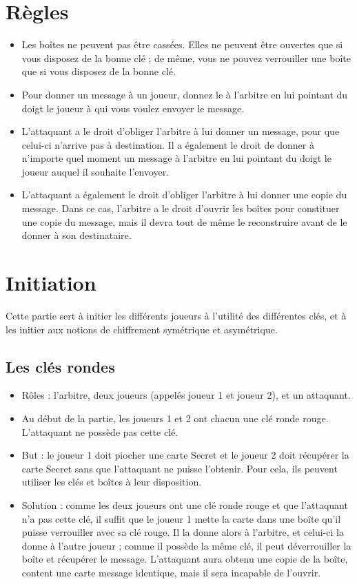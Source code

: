 \documentclass[a4paper,10pt]{article}
\begin{document}
\section{Règles}
\begin{itemize}
\item Les boîtes ne peuvent pas être cassées. Elles ne peuvent être ouvertes que si vous disposez de la bonne clé ; de même, vous ne pouvez verrouiller une boîte que si vous disposez de la bonne clé.
\item Pour donner un message à un joueur, donnez le à l'arbitre en lui pointant du doigt le joueur à qui vous voulez envoyer le message.
\item L'attaquant a le droit d'obliger l'arbitre à lui donner un message, pour que celui-ci n'arrive pas à destination. Il a également le droit de donner à n'importe quel moment un message à l'arbitre en lui pointant du doigt le joueur auquel il souhaite l'envoyer. 
\item L'attaquant a également le droit d'obliger l'arbitre à lui donner une copie du message. Dans ce cas, l'arbitre a le droit d'ouvrir les boîtes pour constituer une copie du message, mais il devra tout de même le reconstruire avant de le donner à son destinataire.
\end{itemize}


\section{Initiation}
Cette partie sert à initier les différents joueurs à l'utilité des différentes clés, et à les initier aux notions de chiffrement symétrique et asymétrique.
\subsection{Les clés rondes}
\begin{itemize}
	\item Rôles : l'arbitre, deux joueurs (appelés joueur 1 et joueur 2), et un attaquant.
	\item Au début de la partie, les joueurs 1 et 2 ont chacun une clé ronde rouge. L'attaquant ne possède pas cette clé.
	\item But : le joueur 1 doit piocher une carte Secret et le joueur 2 doit récupérer la carte Secret sans que l'attaquant ne puisse l'obtenir. Pour cela, ils peuvent utiliser les clés et boîtes à leur disposition.
	\item Solution : comme les deux joueurs ont une clé ronde rouge et que l'attaquant n'a pas cette clé, il suffit que le joueur 1 mette la carte dans une boîte qu'il puisse verrouiller avec sa clé rouge. Il la donne alors à l'arbitre, et celui-ci la donne à l'autre joueur ; comme il possède la même clé, il peut déverrouiller la boîte et récupérer le message. L'attaquant aura obtenu une copie de la boîte, content une carte message identique, mais il sera incapable de l'ouvrir.
\end{itemize}
\end{document}
